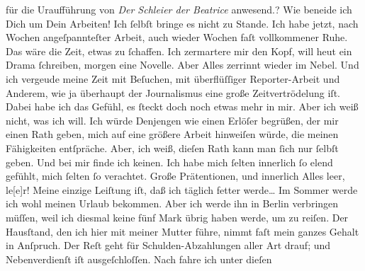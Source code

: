 \begin{ledgroupsized}[t]{13cm}
{{{                  für die Uraufführung von \emph{Der Schleier der
                     Beatrice} anwesend.}}}\label{K_L02911-4h}?\pend
           \pstart
           Wie beneide ich Dich um Dein Arbeiten! Ich ſelbſt bringe es nicht zu Stande. Ich habe
               jetzt, nach Wochen angeſpannteſter Arbeit, auch wieder Wochen faſt vollkommener Ruhe.
               Das wäre die Zeit, etwas zu ſchaffen. Ich zermartere mir den Kopf, will heut ein
               Drama ſchreiben, morgen eine Novelle. Aber Alles {\pb}zerrinnt wieder im Nebel. Und ich vergeude meine Zeit mit Beſuchen, mit
               überflüſſiger Reporter-Arbeit und Anderem, wie ja überhaupt der Journalismus eine
               große Zeitvertrödelung iſt. Dabei habe ich das Gefühl, es ſteckt doch noch etwas mehr
               in mir. Aber ich weiß nicht, was ich will. Ich würde Denjengen\strikeout{,} wie einen Erlöſer begrüßen, der mir einen Rath geben,
               mich auf eine größere Arbeit hinweiſen würde, die  meinen Fähigkeiten entſpräche. Aber, ich weiß, dieſen Rath kann man ſich nur
               ſelbſt geben. Und bei mir finde ich keinen. Ich habe mich ſelten innerlich ſo elend
               gefühlt, mich ſelten ſo verachtet. Große Prätentionen, und innerlich {\pb}Alles leer, le{[}e{]}r! Meine einzige
               Leiſtung iſt, daß ich täglich fetter werde{\dots}\pend
           \pstart
           Im Sommer werde ich wohl meinen Urlaub bekommen. Aber ich werde ihn in Berlin verbringen müſſen, weil ich diesmal keine
               fünf Mark übrig haben werde, um zu reiſen. Der Hausſtand, den ich hier mit meiner Mutter führe,  nimmt faſt mein ganzes Gehalt in Anſpruch. Der Reſt
               geht für Schulden-Abzahlungen aller Art drauf; und Nebenverdienſt iſt ausgeſchloſſen.
               Nach \label{K_L02911-5v}\label{K_L02911-5h} fahre ich unter dieſen

\end{ledgroupsized}

